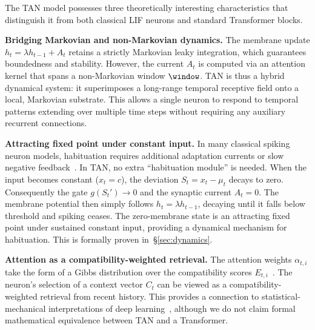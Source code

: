The TAN model possesses three theoretically interesting characteristics that distinguish it from both classical LIF neurons and standard Transformer blocks.

\textbf{Bridging Markovian and non-Markovian dynamics.} The membrane update $h_t = \lambda h_{t-1} + A_t$ retains a strictly Markovian leaky integration, which guarantees boundedness and stability. However, the current $A_t$ is computed via an attention kernel that spans a non-Markovian window $\window$. TAN is thus a hybrid dynamical system: it superimposes a long-range temporal receptive field onto a local, Markovian substrate. This allows a single neuron to respond to temporal patterns extending over multiple time steps without requiring any auxiliary recurrent connections.

\textbf{Attracting fixed point under constant input.} In many classical spiking neuron models, habituation requires additional adaptation currents or slow negative feedback~\cite{benda2003,neftci2019}. In TAN, no extra ``habituation module'' is needed. When the input becomes constant ($x_t = c$), the deviation $S_t = x_t - \mu_t$ decays to zero. Consequently the gate $g(S_t') \to 0$ and the synaptic current $A_t = 0$. The membrane potential then simply follows $h_t = \lambda h_{t-1}$, decaying until it falls below threshold and spiking ceases. The zero-membrane state is an attracting fixed point under sustained constant input, providing a dynamical mechanism for habituation. This is formally proven in~\S\ref{sec:dynamics}.

\textbf{Attention as a compatibility-weighted retrieval.} The attention weights $\alpha_{t,i}$ take the form of a Gibbs distribution over the compatibility scores $E_{t,i}$~\cite{jaynes1957,boltzmann1868,gibbs1902}. The neuron's selection of a context vector $C_t$ can be viewed as a compatibility-weighted retrieval from recent history. This provides a connection to statistical-mechanical interpretations of deep learning~\cite{bahri2020}, although we do not claim formal mathematical equivalence between TAN and a Transformer.

